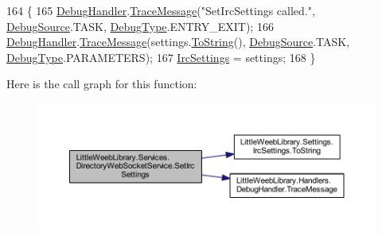 \begin{DoxyCode}
164         \{
165             \mbox{\hyperlink{class_little_weeb_library_1_1_handlers_1_1_debug_handler}{DebugHandler}}.\mbox{\hyperlink{class_little_weeb_library_1_1_handlers_1_1_debug_handler_afccb37dfd6b2114af72000c2f4fe4607}{TraceMessage}}(\textcolor{stringliteral}{"SetIrcSettings called."}, 
      \mbox{\hyperlink{namespace_little_weeb_library_1_1_handlers_a2a6ca0775121c9c503d58aa254d292be}{DebugSource}}.TASK, \mbox{\hyperlink{namespace_little_weeb_library_1_1_handlers_ab66019ed40462876ec4e61bb3ccb0a62}{DebugType}}.ENTRY\_EXIT);
166             \mbox{\hyperlink{class_little_weeb_library_1_1_handlers_1_1_debug_handler}{DebugHandler}}.\mbox{\hyperlink{class_little_weeb_library_1_1_handlers_1_1_debug_handler_afccb37dfd6b2114af72000c2f4fe4607}{TraceMessage}}(settings.\mbox{\hyperlink{class_little_weeb_library_1_1_settings_1_1_irc_settings_a2e1d7f26d7d3083d19c3a9e6c6c2d0b2}{ToString}}(), 
      \mbox{\hyperlink{namespace_little_weeb_library_1_1_handlers_a2a6ca0775121c9c503d58aa254d292be}{DebugSource}}.TASK, \mbox{\hyperlink{namespace_little_weeb_library_1_1_handlers_ab66019ed40462876ec4e61bb3ccb0a62}{DebugType}}.PARAMETERS);
167             \mbox{\hyperlink{class_little_weeb_library_1_1_settings_1_1_irc_settings}{IrcSettings}} = settings;
168         \}
\end{DoxyCode}
Here is the call graph for this function\+:\nopagebreak
\begin{figure}[H]
\begin{center}
\leavevmode
\includegraphics[width=350pt]{class_little_weeb_library_1_1_services_1_1_directory_web_socket_service_a223c62acb36e1ac602552fa1ecf67057_cgraph}
\end{center}
\end{figure}
\mbox{\label{class_little_weeb_library_1_1_services_1_1_directory_web_socket_service_a015a3ae2bb0f275de152ae039fad566e}} 
